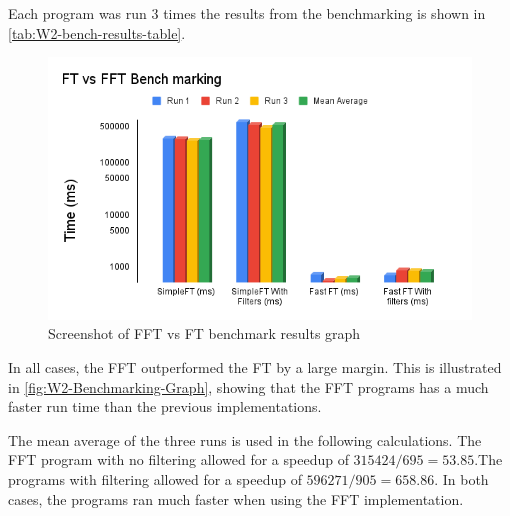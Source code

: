     Each program was run 3 times the results from the benchmarking is shown in \autoref{tab:W2-bench-results-table}. 

    \begin{table}[htbp]
      \centering
      \caption{Lab 2 FFT Benchmarking Results}
      \label{tab:W2-bench-results-table}
    \end{table}
    
    \begin{figure}[H] 
        \centering
        \includegraphics[width=0.8\columnwidth]{Figures/Week 2/FT vs FFT Bench marking.png}
        \caption{Screenshot of FFT vs FT benchmark results graph}
        \label{fig:W2-Benchmarking-Graph}
    \end{figure}

    In all cases, the FFT outperformed the FT by a large margin. This is illustrated in \autoref{fig:W2-Benchmarking-Graph}, showing that the FFT programs has a much faster run time than the previous implementations. 
    
    The mean average of the three runs is used in the following calculations. The FFT program with no filtering allowed for a speedup of  $315424 / 695 = 53.85$.The programs with filtering allowed for a speedup of $596271 / 905 = 658.86$. In both cases, the programs ran much faster when using the FFT implementation.

